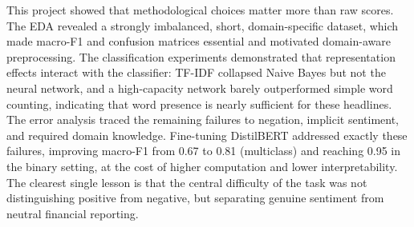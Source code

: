 \documentclass[sigconf,nonacm]{acmart}
\begin{document}
This project showed that methodological choices matter more than raw scores. The EDA revealed a strongly imbalanced, short, domain-specific dataset, which made macro-F1 and confusion matrices essential and motivated domain-aware preprocessing. The classification experiments demonstrated that representation effects interact with the classifier: TF-IDF collapsed Naive Bayes but not the neural network, and a high-capacity network barely outperformed simple word counting, indicating that word presence is nearly sufficient for these headlines. The error analysis traced the remaining failures to negation, implicit sentiment, and required domain knowledge. Fine-tuning DistilBERT addressed exactly these failures, improving macro-F1 from 0.67 to 0.81 (multiclass) and reaching 0.95 in the binary setting, at the cost of higher computation and lower interpretability. The clearest single lesson is that the central difficulty of the task was not distinguishing positive from negative, but separating genuine sentiment from neutral financial reporting.
\end{document}
